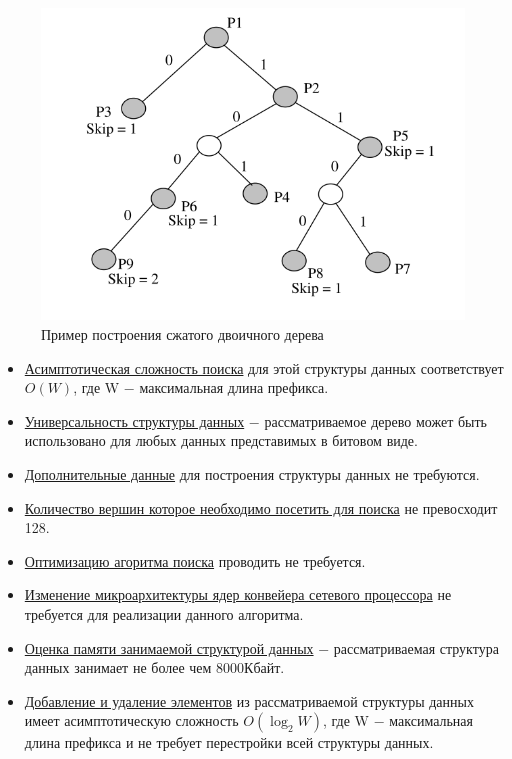 \documentclass[a4peper, 12pt, titlepage, finall]{report}
\begin{document}
            \begin{figure}[h]
                \includegraphics[width=\textwidth]{patricia_trie.png}
                \caption{Пример построения сжатого двоичного дерева}\label{fig:mesh2}
            \end{figure}

            \begin{itemize}
                \item\underline{Асимптотическая сложность поиска} для этой структуры данных соответствует {\ttfamily $O(W)$},
                где {\ttfamily W} $-$ максимальная длина префикса.
                \item\underline{Универсальность структуры данных} $-$ рассматриваемое дерево может быть использовано для любых данных представимых в битовом виде.
                \item\underline{Дополнительные данные} для построения структуры данных не требуются.
                \item\underline{Количество вершин которое необходимо посетить для поиска} не превосходит 128.
                \item\underline{Оптимизацию агоритма поиска} проводить не требуется.
                \item\underline{Изменение микроархитектуры ядер конвейера сетевого процессора} не требуется для реализации данного алгоритма.
                \item\underline{Оценка памяти занимаемой структурой данных} $-$ рассматриваемая структура данных занимает не более чем 8000Кбайт.
                \item\underline{Добавление и удаление элементов} из рассматриваемой структуры данных имеет асимптотическую сложность 
                {\ttfamily $O(\log_2{W})$}, где {\ttfamily W} $-$ максимальная длина префикса и не требует перестройки всей структуры данных.
            \end{itemize}
\end{document}
